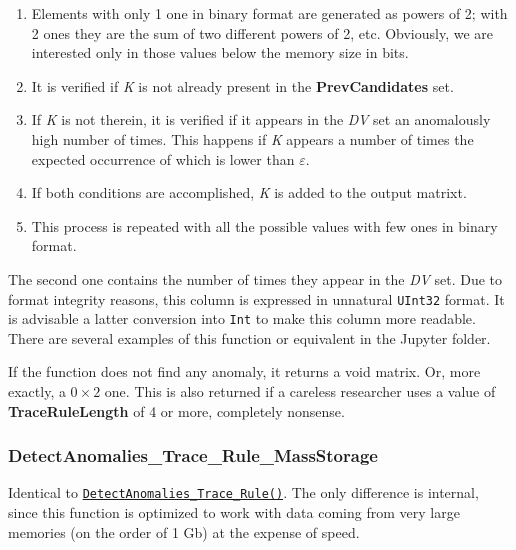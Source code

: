 \begin{itemize}
	 \begin{enumerate}
	 	\item Elements with only 1 one in binary format are generated as powers of 2; with 2 ones they are the sum of two different powers of 2, etc. Obviously, we are interested only in those values below the memory size in bits.
	 	\item It is verified if \textit{K} is not already present in the \textbf{PrevCandidates} set.
	 	\item If \textit{K} is not therein, it is verified if it appears in the \textit{DV} set an anomalously high number of times. This happens if \textit{K} appears a number of times the expected occurrence of which is lower than \textbf{\(\varepsilon\)}.
	 	\item If both conditions are accomplished, \textit{K} is added to the output matrixt.
	 	\item This process is repeated with all the possible values with few ones in binary format.
	 \end{enumerate}
	 
	 The second one contains the number of times they appear in the \textit{DV} set. Due to format integrity reasons, this column is expressed in unnatural \texttt{UInt32} format. 	 
	 It is advisable a latter conversion into \texttt{Int} to make this column more readable. There are several examples of this function or equivalent in the Jupyter folder.
	 
	 If the function does not find any anomaly, it returns a void matrix.  Or, more exactly, a \(0\times 2\) one. This is also returned if a careless researcher uses a value of \textbf{TraceRuleLength} of 4 or more, completely nonsense.
	 
\end{itemize}
%
\subsubsection*{DetectAnomalies\_Trace\_Rule\_MassStorage}\label{Fun:DetectAnomaliesTraceRule_MassStorage}
%
Identical to \hyperref[Fun:DetectAnomaliesTraceRule]{\texttt{DetectAnomalies\_Trace\_Rule()}}. The only difference is internal, since this function is optimized to work with data coming from very large memories (on the order of 1 Gb) at the expense of speed. 
%
%
